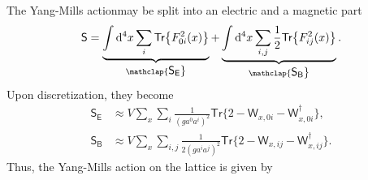 The Yang-Mills actionmay be split into an electric and a magnetic part
\begin{align*}
    \textsf{S}=\underbrace{\int \mathrm{d}^{4}x \sum_{i}\textsf{Tr}\big\{F_{0i}^2(x)\big\}}_{\mathclap{\textstyle \textsf{S}_\textsf{E}}}+\underbrace{\int \mathrm{d}^{4}x\sum_{i, j} \frac{1}{2} \textsf{Tr}\big\{F_{ij}^2(x)\big\}}_{\mathclap{\textstyle \textsf{S}_\textsf{B}}}.
\end{align*}
Upon discretization, they become
\begin{align*}
    \textsf{S}_\textsf{E}& \approx V \sum_{x} \sum_{i} \frac{1}{\left(g a^{0} a^{i}\right)^{2}} \textsf{Tr}\big\{2-\textsf{W}_{x, 0 i}-\textsf{W}_{x, 0 i}^{\dagger}\big\}, \\
    \textsf{S}_\textsf{B}& \approx V \sum_{x} \sum_{i, j} \frac{1}{2\left(g a^{i} a^{j}\right)^{2}} \textsf{Tr}\big\{2-\textsf{W}_{x, i j}-\textsf{W}_{x, i j}^{\dagger}\big\}.
\end{align*}
Thus, the Yang-Mills action on the lattice is given by
\begin{fullwidth}
\end{fullwidth}


